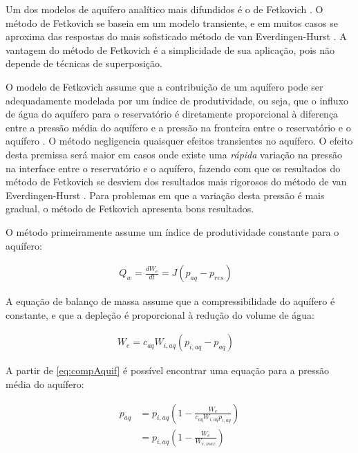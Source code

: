 \documentclass[final,5p]{elsarticle}
\numberwithin{equation}{section}
\begin{document}
        Um dos modelos de aquífero analítico mais difundidos é o de Fetkovich \cite{schlumberger2009technical} \cite{computer2022cmg} \cite{rosa2006engenharia}. O método de Fetkovich se baseia em um modelo transiente, e em muitos casos se aproxima das respostas do mais sofisticado método de van Everdingen-Hurst \cite{VanEverdingen-Hurst}. A vantagem do método de Fetkovich é a simplicidade de sua aplicação, pois não depende de técnicas de superposição.

        O modelo de Fetkovich assume que a contribuição de um aquífero pode ser adequadamente modelada por um índice de produtividade, ou seja, que o influxo de água do aquífero para o reservatório é diretamente proporcional à diferença entre a pressão média do aquífero e a pressão na fronteira entre o reservatório e o aquífero \cite{fetkovich1971simplified}. O método negligencia quaisquer efeitos transientes no aquífero. O efeito desta premissa será maior em casos onde existe uma \emph{rápida} variação na pressão na interface entre o reservatório e o aquífero, fazendo com que os resultados do método de Fetkovich se desviem dos resultados mais rigorosos do método de van Everdingen-Hurst \cite{AHMED2019663}. Para problemas em que a variação desta pressão é mais gradual, o método de Fetkovich apresenta bons resultados.

        O método primeiramente assume um índice de produtividade constante para o aquífero:

        \begin{align}
            Q_w = \frac{dW_e}{dt} = J (p_{aq} - p_{res})& \label{eq:j}
        \end{align}

        A equação de balanço de massa assume que a compressibilidade do aquífero é constante, e que a depleção é proporcional à redução do volume de água:

        \begin{align}
            W_e = c_{aq} W_{i,aq} (p_{i,aq} - p_{aq})& \label{eq:compAquif}
        \end{align}

        A partir de \ref{eq:compAquif} é possível encontrar uma equação para a pressão média do aquífero:

        \begin{align}
            p_{aq} &= p_{i,aq} \left( 1 - \frac{W_e}{c_{aq} W_{i,aq} p_{i,aq}} \right) \nonumber \\
            &= p_{i,aq} \left( 1 - \frac{W_e}{W_{e,max}} \right) \label{eq:pAquif}
        \end{align}
\end{document}
